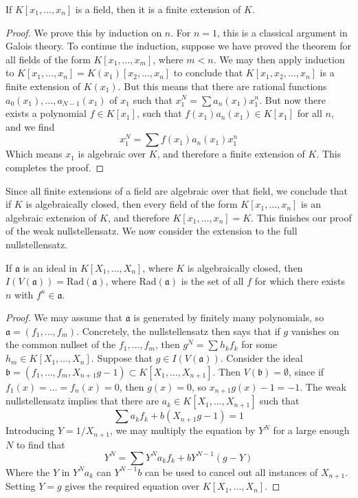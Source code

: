 \begin{lemma}
    If $K[x_1, \dots, x_n]$ is a field, then it is a finite extension of $K$.
\end{lemma}
\begin{proof}
    We prove this by induction on $n$. For $n = 1$, this is a classical argument in Galois theory. To continue the induction, suppose we have proved the theorem for all fields of the form $K[x_1, \dots, x_m]$, where $m < n$. We may then apply induction to $K[x_1, \dots, x_n] = K(x_1)[x_2, \dots, x_n]$ to conclude that $K[x_1, x_2, \dots, x_n]$ is a finite extension of $K(x_1)$. But this means that there are rational functions $a_0(x_1), \dots, a_{N-1}(x_1)$ of $x_1$ such that $x_1^N = \sum a_n(x_1) x_1^n$. But now there exists a polynomial $f \in K[x_1]$, such that $f(x_1) a_n(x_1) \in K[x_1]$ for all $n$, and we find
    \[ x_1^N = \sum f(x_1) a_n(x_1) x_1^n \]
    Which means $x_1$ is algebraic over $K$, and therefore a finite extension of $K$. This completes the proof.
\end{proof}

Since all finite extensions of a field are algebraic over that field, we conclude that if $K$ is algebraically closed, then every field of the form $K[x_1, \dots, x_n]$ is an algebraic extension of $K$, and therefore $K[x_1, \dots, x_n] = K$. This finishes our proof of the weak nullstellensatz. We now consider the extension to the full nullstellensatz.

\begin{theorem}
    If $\mathfrak{a}$ is an ideal in $K[X_1, \dots, X_n]$, where $K$ is algebraically closed, then $I(V(\mathfrak{a})) = \text{Rad}(\mathfrak{a})$, where $\text{Rad}(\mathfrak{a})$ is the set of all $f$ for which there exists $n$ with $f^n \in \mathfrak{a}$.
\end{theorem}
\begin{proof}
    We may assume that $\mathfrak{a}$ is generated by finitely many polynomials, so $\mathfrak{a} = (f_1, \dots, f_m)$.  Concretely, the nullstellensatz then says that if $g$ vanishes on the common nullset of the $f_1, \dots, f_m$, then $g^N = \sum h_kf_k$ for some $h_m \in K[X_1, \dots, X_n]$. Suppose that $g \in I(V(\mathfrak{a}))$. Consider the ideal $\mathfrak{b} = (f_1, \dots, f_m, X_{n+1}g - 1) \subset K[X_1, \dots, X_{n+1}]$. Then $V(\mathfrak{b}) = \emptyset$, since if $f_1(x) = \dots = f_n(x) = 0$, then $g(x) = 0$, so $x_{n+1}g(x) - 1 = -1$. The weak nullstellensatz implies that there are $a_k \in K[X_1, \dots, X_{n+1}]$ such that
    \[ \sum a_k f_k + b (X_{n+1}g - 1) = 1 \]
    Introducing $Y = 1/X_{n+1}$, we may multiply the equation by $Y^N$ for a large enough $N$ to find that
    \[ Y^N = \sum Y^N a_k f_k + b Y^{N-1}(g - Y) \]
    Where the $Y$ in $Y^N a_k$  can $Y^{N-1}b$ can be used to cancel out all instances of $X_{n+1}$. Setting $Y = g$ gives the required equation over $K[X_1, \dots, X_n]$.
\end{proof}

